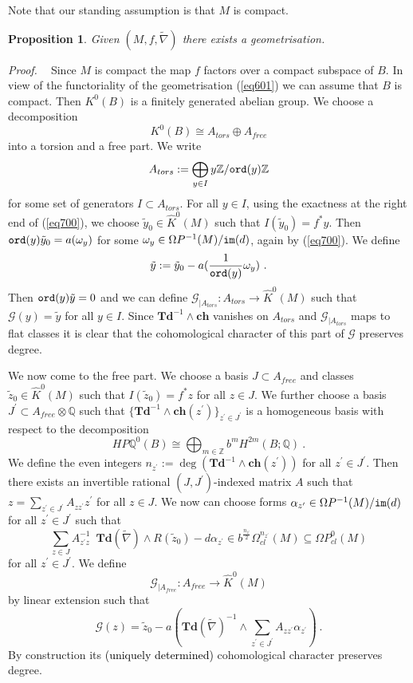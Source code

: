 \documentclass[12pt]{article}
\newtheorem{prop}[theorem]{Proposition}
\newcommand{\ord}{{\tt ord}}
\newcommand{\im}{{\tt im}}
\newcommand{\cG}{{\mathcal{G}}}
\newcommand{\proof}{{\it Proof.$\:\:\:\:$}}
\newcommand{\Z}{{\mathbb{Z}}}
\newcommand{\Q}{{\mathbb{Q}}}
\newcommand{\Td}{{\mathbf{Td}}}
\newcommand{\ch}{{\mathbf{ch}}}
\begin{document}
Note that our standing assumption is that $M$ is compact. 
 \begin{prop}\label{prop904}
Given $(M,f,\tilde \nabla)$ there exists a geometrisation.
\end{prop}
\proof
Since $M$ is compact the map $f$ factors over a compact subspace of $B$.
In view of the functoriality of the geometrisation (\ref{eq601}) we can assume that $B$ is compact. Then $K^{0}(B)$ is a finitely generated abelian group.  We choose a   decomposition
$$K^{0}(B)\cong A_{tors}\oplus A_{free}$$
into a torsion and a free part. We write
$$A_{tors}:=\bigoplus_{y\in I} y\Z/\ord(y)\Z $$
for some set  of  generators $I\subset A_{tors}$.
For all $y\in I$, using the exactness at the right end of (\ref{eq700}), we choose  $\tilde y_{0}\in \hat K^{0}(M)$ such that $I(\tilde y_{0})=
f^{*}y$. Then
$\ord(y) \tilde y_{0}=a(\omega_{y})$ for some $\omega_{y}\in \Omega P^{-1}(M)/\im(d)$, again by  (\ref{eq700}).
We define
$$\tilde y:=\tilde y_{0}-a(\frac{1}{\ord(y)}\omega_{y})\ .$$
Then $\ord(y)\tilde y=0$ and we can define
$\cG_{|A_{tors}}:A_{tors}\to \hat K^{0}(M)$ such that $\cG(y)=\tilde y$ for all $y\in I$.
Since $\Td^{-1}\wedge \ch$ vanishes on $A_{tors}$ and $\cG_{|A_{tors}}$ maps to flat classes
it is clear that the cohomological character of this part of $\cG$  preserves degree.

We now come to the free part. We choose a basis $J\subset A_{free}$ and  classes
$\tilde z_{0}\in \hat K^{0}(M)$ such that $I(\tilde z_{0})=f^{*}z$ for all $z\in J$.
We further choose a basis 
$J^{\prime}\subset A_{free}\otimes \Q$ such that
$\{\Td^{-1}\wedge \ch(z^{\prime})\}_{z^{\prime}\in J^{\prime}}$ is a homogeneous basis with respect to the decomposition
 $$HP\Q^{0}(B)\cong \bigoplus_{m\in \Z} b^{m}H^{2m}(B;\Q)\ .$$ 
 We define the even integers  $n_{z^{\prime}}:=\deg(\Td^{-1}\wedge \ch(z^{\prime}))$ for all $z^{\prime}\in J^{\prime}$.
Then there exists an invertible rational $(J,J^{\prime})$-indexed matrix $A$ such that
$z=\sum_{z^{\prime}\in J^{\prime}}A_{z z^{\prime}} z^{\prime}$ for all $z\in J$. 
We now can choose forms $\alpha_{z^{\prime}}\in \Omega P^{-1}(M)/\im(d)$ for all $z^{\prime}\in J^{\prime}$ such that
$$\sum_{z\in J}A^{-1}_{z^{\prime}z} \;\: \Td(\tilde \nabla)\wedge R(\tilde z_{0})-  d\alpha_{z^{\prime}}\in b^{\frac{n_{z^{\prime}}}{2}}\Omega_{cl}^{n_{z^{\prime}}}(M)\subseteq \Omega P_{cl}^{0}(M)$$
for all $z^{\prime}\in J^{\prime}$.
We define
$$\cG_{|A_{free}}:A_{free}\to \hat K^{0}(M)$$ by linear extension
such that
$$\cG(z)=\tilde z_{0}-a(\Td(\tilde \nabla)^{-1}\wedge \sum_{z^{\prime}\in J^{\prime}} A_{zz^{\prime}}\alpha_{z^{\prime}})\ .$$
By construction its \textcolor{black}{(uniquely determined)} cohomological character preserves degree.
\end{document}
